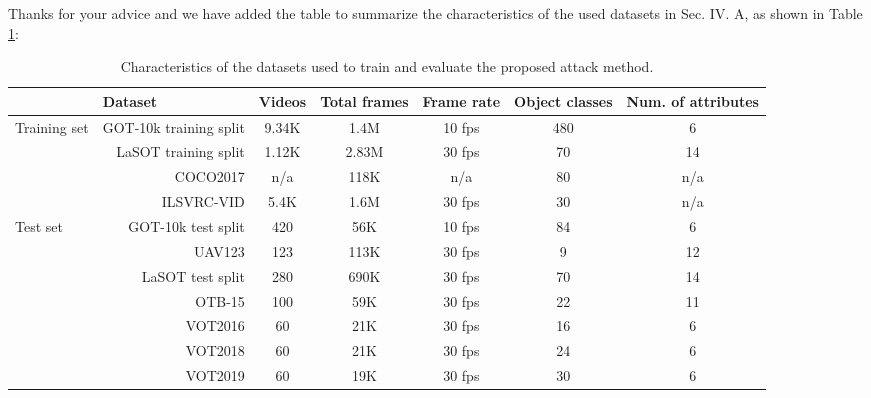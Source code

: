 \documentclass{article}
\begin{document}
Thanks for your advice and we have added the table to summarize the characteristics of the used datasets in Sec. IV. A, as shown in Table \ref{tab:dataset}:
\begin{table}[h]
    \caption{Characteristics of the datasets used to train and evaluate the proposed attack method.}
    \begin{tabular}{lrccccc} \toprule
    \multicolumn{2}{c}{Dataset}                            & Videos & Total frames & Frame rate & Object classes & Num. of attributes \\ \midrule
    \multirow{4}{*}{Training set} & GOT-10k training split & 9.34K & 1.4M        & 10 fps     & 480            & 6                  \\
                                  & LaSOT training split   & 1.12K & 2.83M        & 30 fps     & 70             & 14                 \\
                                  & COCO2017               & n/a    & 118K         & n/a        & 80             & n/a                \\
                                  & ILSVRC-VID             & 5.4K  & 1.6M         & 30 fps     & 30             & n/a                \\ \midrule
    \multirow{7}{*}{Test set}     & GOT-10k test split     & 420    & 56K          & 10 fps     & 84             & 6                  \\
                                  & UAV123                 & 123    & 113K         & 30 fps     & 9              & 12                 \\
                                  & LaSOT test split       & 280    & 690K         & 30 fps     & 70             & 14                 \\
                                  & OTB-15                 & 100    & 59K          & 30 fps     & 22             & 11                 \\
                                  & VOT2016                & 60     & 21K          & 30 fps     & 16             & 6                  \\
                                  & VOT2018                & 60     & 21K          & 30 fps     & 24             & 6                  \\ 
                                  & VOT2019                & 60     & 19K          & 30 fps     & 30             & 6                  \\ \bottomrule
    \end{tabular}
    \label{tab:dataset}
\end{table}
\end{document}
